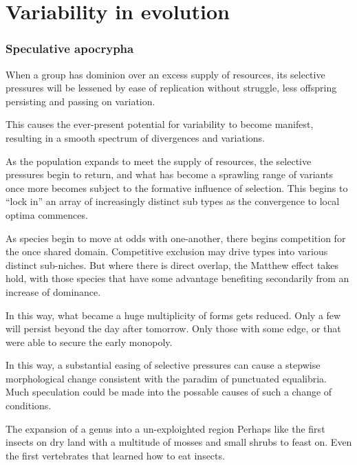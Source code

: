 



\chapter{Variability in evolution}











\subsection*{Speculative apocrypha}



When a group has dominion over an excess supply of resources, its selective pressures will be lessened by ease of replication without struggle, less offspring persisting and passing on variation.

This causes the ever-present potential for variability to become manifest, resulting in a smooth spectrum of divergences and variations. 

As the population expands to meet the supply of resources, the selective pressures begin to return, and what has become a sprawling range of variants once more becomes subject to the formative influence of selection. This begins to ``lock in'' an array of increasingly distinct sub types as the convergence to local optima commences. 

As species begin to move at odds with one-another, there begins competition for the once shared domain. Competitive exclusion may drive types into various distinct sub-niches. But where there is direct overlap, the Matthew effect takes hold, with those species that have some advantage benefiting secondarily from an increase of dominance. 

In this way, what became a huge multiplicity of forms gets reduced. Only a few will persist beyond the day after tomorrow. Only those with some edge, or that were able to secure the early monopoly.

In this way, a substantial easing of selective pressures can cause a stepwise morphological change consistent with the paradim of punctuated equalibria. Much speculation could be made into the possable causes of such a change of conditions. 

The expansion of a genus into a un-exploighted region
Perhaps like the first insects on dry land with a multitude of mosses and small shrubs to feast on. 
Even the first vertebrates that learned how to eat insects. 

